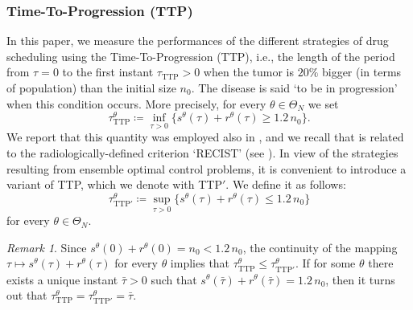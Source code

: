 \documentclass[a4paper,12pt, reqno]{amsart}
\theoremstyle{plain}
\theoremstyle{definition}
\theoremstyle{remark}
\newtheorem{remark}{Remark}
\numberwithin{equation}{section}
\begin{document}
\subsubsection*{Time-To-Progression (TTP)} 
In this paper, we measure the performances of the different strategies of drug scheduling using the Time-To-Progression (TTP), i.e., the length of the period from $\tau=0$ to the first instant $\tau_{\mathrm{TTP}}>0$ when the tumor is $20\%$ bigger (in terms of population) than the initial size $n_0$.
The disease is said `to be in progression' when this condition occurs.
More precisely, for every $\theta\in\Theta_N$ we set
\begin{equation} \label{eq:def_TTP}
    \tau_{\mathrm{TTP}}^\theta \coloneqq
    \inf_{\tau>0}\{ s^\theta(\tau) + r^\theta(\tau) \geq 1.2\, n_0 \}.
\end{equation}
We report that this quantity was employed also in \cite{turnover2021}, and we recall that is related to the radiologically-defined criterion `RECIST' (see \cite{eisenhauer2009RECIST}).
In view of the strategies resulting from ensemble optimal control problems, it is convenient to introduce a variant of TTP, which we denote with TTP$'$. We define it as follows:
\begin{equation} \label{eq:def_TTP'}
    \tau_{\mathrm{TTP'}}^\theta \coloneqq
    \sup_{\tau>0}\{ s^\theta(\tau) + r^\theta(\tau) \leq 1.2\, n_0 \}
\end{equation}
for every $\theta\in\Theta_N$.
\begin{remark} \label{rmk:TTPvsTTP'}
    Since $s^\theta(0) + r^\theta(0)=n_0< 1.2 \, n_0$, the continuity of the mapping $\tau\mapsto s^\theta(\tau) + r^\theta(\tau)$ for every $\theta$ implies that $\tau_{\mathrm{TTP}}^\theta \leq \tau_{\mathrm{TTP'}}^\theta $.
    If for some $\theta$ there exists a unique instant $\bar \tau >0$ such that $s^\theta(\bar \tau) + r^\theta(\bar \tau) = 1.2\, n_0$, then it turns out that $\tau_{\mathrm{TTP}}^\theta  = \tau_{\mathrm{TTP'}}^\theta = \bar \tau$.
\end{remark}
\end{document}
